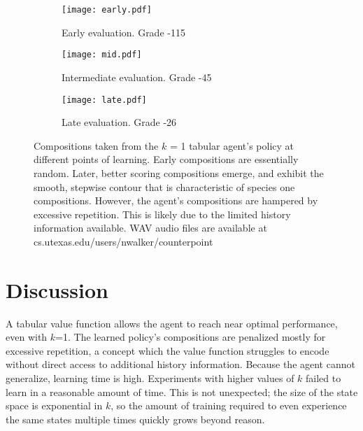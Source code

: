 \documentclass{article}
\begin{document}
    \begin{figure*}
    \begin{subfigure}{\linewidth}
        \texttt{[image: early.pdf]}
        \caption{Early evaluation. Grade -115}
        \vspace{1cm}
    \end{subfigure}
    
    \begin{subfigure}{\linewidth}
        \texttt{[image: mid.pdf]}
        \caption{Intermediate evaluation. Grade -45}
        \vspace{1cm}
    \end{subfigure}
    
    \begin{subfigure}{\linewidth}
        \texttt{[image: late.pdf]}
        \caption{Late evaluation. Grade -26}
        \vspace{1cm}
    \end{subfigure}
    \caption{Compositions taken from the $k$ = 1 tabular agent's policy at different points of learning. Early compositions are essentially random. Later, better scoring compositions emerge, and exhibit the smooth, stepwise contour that is characteristic of species one compositions. However, the agent's compositions are hampered by excessive repetition. This is likely due to the limited history information available. WAV audio files are available at cs.utexas.edu/users/nwalker/counterpoint}

    \end{figure*}

	\section{Discussion}
    
    A tabular value function allows the agent to reach near optimal performance, even with $k$=1. The learned policy's compositions are penalized mostly for excessive repetition, a concept which the value function struggles to encode without direct access to additional history information. Because the agent cannot generalize, learning time is high. Experiments with higher values of $k$ failed to learn in a reasonable amount of time. This is not unexpected; the size of the state space is exponential in $k$, so the amount of training required to even experience the same states multiple times quickly grows beyond reason.
    
\end{document}
